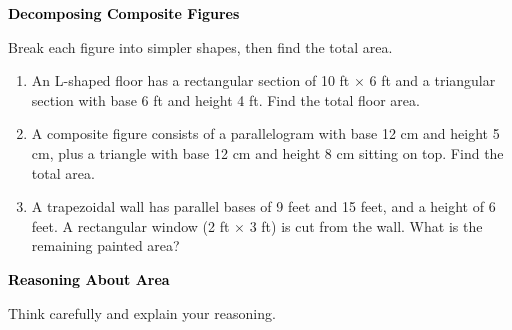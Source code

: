 \documentclass[12pt, letterpaper, fleqn]{article}
\begin{document}
\newpage

\begin{tcolorbox}[colback=black!10]
\large\textcolor{black}{\textbf{Decomposing Composite Figures}}
\end{tcolorbox}

\noindent
Break each figure into simpler shapes, then find the total area.

\vspace{3mm}

\begin{enumerate}[itemsep=2.3cm, leftmargin=0.6cm]

\item An L-shaped floor has a rectangular section of 10 ft $\times$ 6 ft and a triangular section with base 6 ft and height 4 ft. Find the total floor area.

\vspace{2.2cm}

\item A composite figure consists of a parallelogram with base 12 cm and height 5 cm, plus a triangle with base 12 cm and height 8 cm sitting on top. Find the total area.

\vspace{2.2cm}

\item A trapezoidal wall has parallel bases of 9 feet and 15 feet, and a height of 6 feet. A rectangular window (2 ft $\times$ 3 ft) is cut from the wall. What is the remaining painted area?

\vspace{2.5cm}

\end{enumerate}

\newpage

\begin{tcolorbox}[colback=black!10]
\large\textcolor{black}{\textbf{Reasoning About Area}}
\end{tcolorbox}

\noindent
Think carefully and explain your reasoning.

\vspace{3mm}
\end{document}
